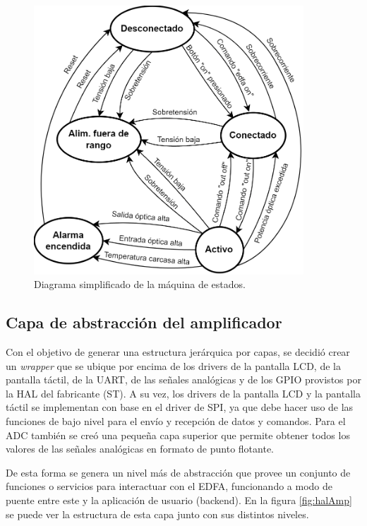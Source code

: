 \begin{figure}[H]
\centering
\includegraphics[width=0.9\textwidth]{./Figures/diagFSM.png}
\caption{Diagrama simplificado de la máquina de estados.}
\label{fig:diagFSM}
\end{figure}

\subsection{Capa de abstracción del amplificador}

Con el objetivo de generar una estructura jerárquica por capas, se decidió crear un \textit{wrapper} que se ubique por encima de los drivers de la pantalla LCD, de la pantalla táctil, de la UART, de las señales analógicas y de los GPIO provistos por la HAL del fabricante (ST). A su vez, los drivers de la pantalla LCD y la pantalla táctil se implementan con base en el driver de SPI, ya que debe hacer uso de las funciones de bajo nivel para el envío y recepción de datos y comandos. Para el ADC también se creó una pequeña capa superior que permite obtener todos los valores de las señales analógicas en formato de punto flotante.

De esta forma se genera un nivel más de abstracción que provee un conjunto de funciones o servicios para interactuar con el EDFA, funcionando a modo de puente entre este y la aplicación de usuario (backend). En la figura \ref{fig:halAmp} se puede ver la estructura de esta capa junto con sus distintos niveles.

